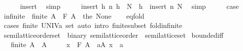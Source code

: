 \begin{isabellebody}
\ \ \ \ \isamarkupfalse%
\ insert\ \isamarkupfalse%
\ simp\isanewline
\ \ \isamarkupfalse%
\ \isamarkupfalse%
\ {\isachardoublequoteopen}insert\ {\isacharparenleft}{\kern0pt}h\ n{\isacharparenright}{\kern0pt}\ {\isacharparenleft}{\kern0pt}h\ {\isacharbackquote}{\kern0pt}\ N{\isacharparenright}{\kern0pt}\ {\isacharequal}{\kern0pt}\ h\ {\isacharbackquote}{\kern0pt}\ insert\ n\ N{\isachardoublequoteclose}\ \isamarkupfalse%
\ simp\isanewline
\ \ \isamarkupfalse%
\ \isamarkupfalse%
\ {\isacharquery}{\kern0pt}case\ \isacommand{{\isachardot}{\kern0pt}}\isamarkupfalse%
\isanewline
{}\isamarkupfalse%
%
\endisatagproof
{\isafoldproof}%
%
\isadelimproof
\isanewline
%
\endisadelimproof
\isanewline
{}\isamarkupfalse%
\ infinite{\isacharcolon}{\kern0pt}\ {\isachardoublequoteopen}{\isasymnot}\ finite\ A\ {\isasymLongrightarrow}\ F\ A\ {\isacharequal}{\kern0pt}\ the\ None{\isachardoublequoteclose}\isanewline
%
\isadelimproof
\ \ %
\endisadelimproof
%
\isatagproof
{}\isamarkupfalse%
\ eq{\isacharunderscore}{\kern0pt}fold{\isacharprime}{\kern0pt}\ \isamarkupfalse%
\ {\isacharparenleft}{\kern0pt}cases\ {\isachardoublequoteopen}finite\ {\isacharparenleft}{\kern0pt}UNIV{\isacharcolon}{\kern0pt}{\isacharcolon}{\kern0pt}{\isacharprime}{\kern0pt}a\ set{\isacharparenright}{\kern0pt}{\isachardoublequoteclose}{\isacharparenright}{\kern0pt}\ {\isacharparenleft}{\kern0pt}auto\ intro{\isacharcolon}{\kern0pt}\ finite{\isacharunderscore}{\kern0pt}subset\ fold{\isacharunderscore}{\kern0pt}infinite{\isacharparenright}{\kern0pt}%
\endisatagproof
{\isafoldproof}%
%
\isadelimproof
\isanewline
%
\endisadelimproof
\isanewline
{}\isamarkupfalse%
\isanewline
\isanewline
{}\isamarkupfalse%
\ semilattice{\isacharunderscore}{\kern0pt}order{\isacharunderscore}{\kern0pt}set\ {\isacharequal}{\kern0pt}\ binary{\isacharquery}{\kern0pt}{\isacharcolon}{\kern0pt}\ semilattice{\isacharunderscore}{\kern0pt}order\ {\isacharplus}{\kern0pt}\ semilattice{\isacharunderscore}{\kern0pt}set\isanewline
{}\isanewline
\isanewline
{}\isamarkupfalse%
\ bounded{\isacharunderscore}{\kern0pt}iff{\isacharcolon}{\kern0pt}\isanewline
\ \ \ {\isachardoublequoteopen}finite\ A{\isachardoublequoteclose}\ \ {\isachardoublequoteopen}A\ {\isasymnoteq}\ {\isacharbraceleft}{\kern0pt}{\isacharbraceright}{\kern0pt}{\isachardoublequoteclose}\isanewline
\ \ \ {\isachardoublequoteopen}x\ \isactrlbold {\isasymle}\ F\ A\ {\isasymlongleftrightarrow}\ {\isacharparenleft}{\kern0pt}{\isasymforall}a{\isasymin}A{\isachardot}{\kern0pt}\ x\ \isactrlbold {\isasymle}\ a{\isacharparenright}{\kern0pt}{\isachardoublequoteclose}\isanewline

\end{isabellebody}
